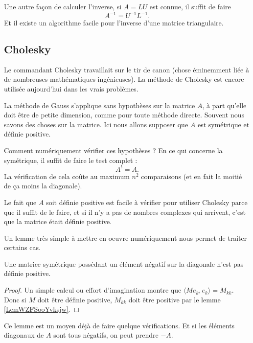 Une autre façon de calculer l'inverse, si \( A=LU\) est connue, il suffit de faire 
\begin{equation}
    A^{-1}=U^{-1}L^{-1}.
\end{equation}
Et il existe un algorithme facile pour l'inverse d'une matrice triangulaire.

\subsection{Cholesky}

Le commandant Cholesky travaillait sur le tir de canon (chose éminemment liée à de nombreuses mathématiques ingénieuses). La méthode de Cholesky est encore utilisée aujourd'hui dans les vrais problèmes.

La méthode de Gauss s'applique sans hypothèses sur la matrice \( A\), à part qu'elle doit être de petite dimension, comme pour toute méthode directe. Souvent nous savons des choses sur la matrice. Ici nous allons supposer que \( A\) est symétrique et définie positive.

Comment numériquement vérifier ces hypothèses ? En ce qui concerne la symétrique, il suffit de faire le test complet :
\begin{equation}
    A^t=A.
\end{equation}
La vérification de cela coûte au maximum \( n^2\) comparaisons (et en fait la moitié de ça moins la diagonale). 

Le fait que \( A\) soit définie positive est facile à vérifier pour utiliser Cholesky parce que il suffit de le faire, et si il n'y a pas de nombres complexes qui arrivent, c'est que la matrice était définie positive.

Un lemme très simple à mettre en oeuvre numériquement nous permet de traiter certains cas.
\begin{lemma}
    Une matrice symétrique possédant un élément négatif sur la diagonale n'est pas définie positive.
\end{lemma}

\begin{proof}
    Un simple calcul ou effort d'imagination montre que \( \langle Me_k, e_k\rangle =M_{kk}\). Donc si \( M\) doit être définie positive, \( M_{kk}\) doit être positive par le lemme \ref{LemWZFSooYvksjw}.
\end{proof}
Ce lemme est un moyen déjà de faire quelque vérifications. Et si les éléments diagonaux de \( A\) sont tous négatifs, on peut prendre \( -A\).

